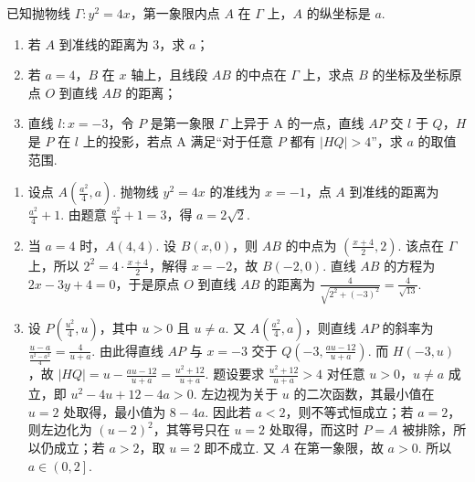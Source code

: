 \begin{problem}
已知抛物线 \(\Gamma:y^2=4x\)，第一象限内点 \(A\) 在 \(\Gamma\) 上，\(A\) 的纵坐标是 \(a\).
\begin{enumerate}
\item 若 \(A\) 到准线的距离为 \(3\)，求 \(a\)；
\item 若 \(a=4\)，\(B\) 在 \(x\) 轴上，且线段 \(AB\) 的中点在 \(\Gamma\) 上，求点 \(B\) 的坐标及坐标原点 \(O\) 到直线 \(AB\) 的距离；
\item 直线 \(l:x=-3\)，令 \(P\) 是第一象限 \(\Gamma\) 上异于 A 的一点，直线 \(AP\) 交 \(l\) 于 \(Q\)，\(H\) 是 \(P\) 在 \(l\) 上的投影，若点 A 满足“对于任意 \(P\) 都有 \(\left|HQ\right|>4\)”，求 \(a\) 的取值范围.
\end{enumerate}
\end{problem}

\begin{solution}
\begin{enumerate}
\item 设点 \(A\left(\frac{a^2}{4},a\right)\). 抛物线 \(y^2=4x\) 的准线为 \(x=-1\)，点 \(A\) 到准线的距离为 \(\frac{a^2}{4}+1\). 由题意 \(\frac{a^2}{4}+1=3\)，得 \(a=2\sqrt2\).

\item 当 \(a=4\) 时，\(A(4,4)\). 设 \(B(x,0)\)，则 \(AB\) 的中点为 \(\left(\frac{x+4}{2},2\right)\). 该点在 \(\Gamma\) 上，所以 \(2^2=4\cdot \frac{x+4}{2}\)，解得 \(x=-2\)，故 \(B(-2,0)\). 直线 \(AB\) 的方程为 \(2x-3y+4=0\)，于是原点 \(O\) 到直线 \(AB\) 的距离为 \(\frac{4}{\sqrt{2^2+(-3)^2}}=\frac{4}{\sqrt{13}}\).

\item 设 \(P\left(\frac{u^2}{4},u\right)\)，其中 \(u>0\) 且 \(u\ne a\). 又 \(A\left(\frac{a^2}{4},a\right)\)，则直线 \(AP\) 的斜率为 \(\frac{u-a}{\frac{u^2-a^2}{4}}=\frac{4}{u+a}\). 由此得直线 \(AP\) 与 \(x=-3\) 交于 \(Q\left(-3,\frac{au-12}{u+a}\right)\). 而 \(H(-3,u)\)，故 \(\left|HQ\right|=u-\frac{au-12}{u+a}=\frac{u^2+12}{u+a}\).
题设要求 \(\frac{u^2+12}{u+a}>4\) 对任意 \(u>0\)，\(u\ne a\) 成立，即 \(u^2-4u+12-4a>0\).
左边视为关于 \(u\) 的二次函数，其最小值在 \(u=2\) 处取得，最小值为 \(8-4a\).
因此若 \(a<2\)，则不等式恒成立；若 \(a=2\)，则左边化为 \((u-2)^2\)，其等号只在 \(u=2\) 处取得，而这时 \(P=A\) 被排除，所以仍成立；若 \(a>2\)，取 \(u=2\) 即不成立.
又 \(A\) 在第一象限，故 \(a>0\).
所以 \(a\in\left(0,2\right]\).
\end{enumerate}
\end{solution}

